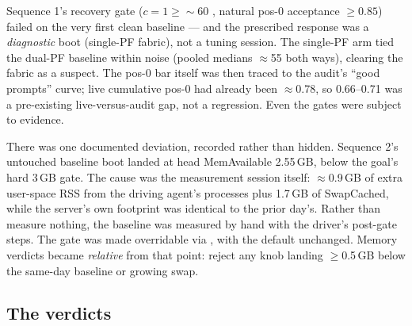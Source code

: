\begin{hbnote}
Sequence 1's recovery gate ($c=1 \geq {\sim}60$ \tokspersec{}, natural pos-0
acceptance $\geq 0.85$) failed on the very first clean baseline --- and the
prescribed response was a \emph{diagnostic} boot (single-PF fabric), not a
tuning session. The single-PF arm tied the dual-PF baseline within noise
(pooled medians $\approx$55 both ways), clearing the fabric as a suspect. The
pos-0 bar itself was then traced to the audit's ``good prompts'' curve; live
cumulative pos-0 had already been $\approx$0.78, so 0.66--0.71 was a
pre-existing live-versus-audit gap, not a regression. Even the gates were
subject to evidence.
\end{hbnote}

There was one documented deviation, recorded rather than hidden. Sequence
2's untouched baseline boot landed at head MemAvailable 2.55\,GB, below the
goal's hard 3\,GB gate. The cause was the measurement session itself:
$\approx$0.9\,GB of extra user-space RSS from the driving agent's
 processes plus 1.7\,GB of SwapCached, while the server's own
footprint was identical to the prior day's. Rather than measure nothing,
the baseline was measured by hand with the driver's post-gate steps. The
gate was made overridable via , with the default
unchanged. Memory verdicts became \emph{relative} from that point: reject
any knob landing $\geq$0.5\,GB below the same-day baseline or growing swap.

\subsection{The verdicts}

